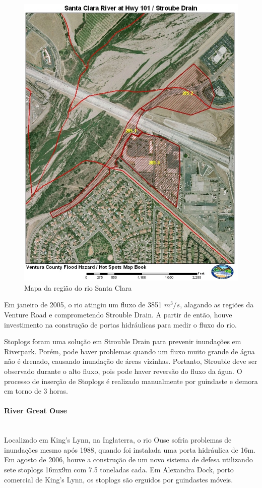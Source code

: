 \begin{figure}[H]
    \centering
    \includegraphics[width=0.5\columnwidth]{figs/pesqbib/1.jpg}
    \caption{Mapa da região do rio Santa Clara}
    \label{pesqbib_1}
\end{figure}
 
Em janeiro de 2005, o rio atingiu um fluxo de 3851 $m^3/s$, alagando as regiões
da Venture Road e comprometendo Strouble Drain. A partir de então, houve
investimento na construção de portas hidráulicas para medir o fluxo do rio. 

Stoplogs foram uma solução em Strouble Drain para prevenir inundações em Riverpark. Porém, pode haver problemas quando um fluxo muito grande de água não é drenado, causando inundação de áreas vizinhas. Portanto, Strouble deve ser observado durante o alto fluxo, pois pode haver reversão do fluxo da água. O processo de inserção de Stoplogs é realizado manualmente por guindaste e demora em torno de 3 horas.

\paragraph{River Great Ouse}\mbox{}\\
Localizado em King’s Lynn, na Inglaterra, o rio Ouse sofria problemas de inundações mesmo após 1988, quando foi instalada uma porta hidráulica de 16m. Em agosto de 2006, houve a construção de um novo sistema de defesa utilizando sete stoplogs 16mx9m com 7.5 toneladas cada. Em Alexandra Dock, porto comercial de King’s Lynn, os stoplogs são erguidos por guindastes móveis.

